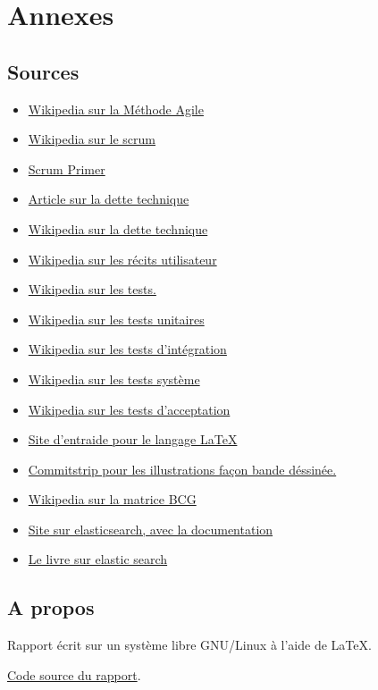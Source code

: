 \chapter{Annexes}

\section{Sources}

\begin{itemize}
\item \href{https://fr.wikipedia.org/wiki/M\%C3\%A9thode_agile}{Wikipedia sur la Méthode Agile}
\item \href{https://fr.wikipedia.org/wiki/Scrum_(m\%C3\%A9thode)}{Wikipedia sur le scrum}
\item \href{http://www.scrumprimer.org/primers/scrumprimer20_french.pdf}{Scrum Primer}
\item \href{http://letrainde13h37.fr/20/apprehender-notion-dette-technique/}{Article sur la dette technique}
\item \href{https://fr.wikipedia.org/wiki/Dette_technique}{Wikipedia sur la dette technique}
\item \href{https://fr.wikipedia.org/wiki/R\%C3\%A9cit_utilisateur}{Wikipedia sur les récits utilisateur}
\item \href{https://fr.wikipedia.org/wiki/Test_(informatique)}{Wikipedia sur les tests. }
\item \href{https://fr.wikipedia.org/wiki/Test_unitaire}{Wikipedia sur les tests unitaires}
\item \href{https://fr.wikipedia.org/wiki/Test_d\%27int\%C3\%A9gration}{Wikipedia sur les tests d'intégration}
\item \href{https://fr.wikipedia.org/wiki/Tests_syst\%C3\%A8me}{Wikipedia sur les tests système}
\item \href{https://fr.wikipedia.org/wiki/Test_d\%27acceptation}{Wikipedia sur les tests d'acceptation}
\item \href{http://tex.stackexchange.com/}{Site d'entraide pour le langage LaTeX}
\item \href{http://www.commitstrip.com/fr/}{Commitstrip pour les illustrations façon bande déssinée.}
\item \href{https://fr.wikipedia.org/wiki/Matrice_BCG}{Wikipedia sur la matrice BCG}
\item \href{https://www.elastic.co/}{Site sur elasticsearch, avec la documentation}
\item \href{http://www.amazon.com/ElasticSearch-Cookbook-Alberto-Paro/dp/1782166629}{Le livre sur elastic search}
\end{itemize}



\section{A propos}
\begin{description}
	\item Rapport écrit sur un système libre GNU/Linux à l'aide de \LaTeX. 
	\item \href{https://github.com/llaine/}{Code source du rapport}.
\end{description}


